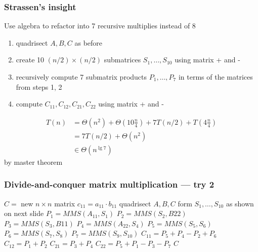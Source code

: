 \documentclass[10pt,aspectratio=169]{beamer}
\begin{document}
\begin{frame} \frametitle{Strassen's insight}
Use algebra to refactor into 7 recursive multiplies instead of 8
\begin{enumerate}
  \item quadrisect $A, B, C$ as before
  \item create 10 $(n/2) \times (n/2)$ submatrices $S_1, \ldots, S_{10}$ using
    matrix + and -
  \item recursively compute 7 submatrix products $P_1, \ldots, P_7$ in terms of
    the matrices from steps 1, 2
  \item compute $C_{11}, C_{12}, C_{21}, C_{22}$ using matrix + and -
\end{enumerate}
\begin{align*}
  T(n) &= \Theta(n^2) + \Theta(10 \frac{n}{4}) + 7 T(n/2) + T(4 \frac{n}{4}) \\
       &= 7 T(n/2) + \Theta(n^2) \\
       &\in \Theta(n^{\lg 7})
\end{align*}
by master theorem
\end{frame}
\begin{frame} \frametitle{Divide-and-conquer matrix multiplication --- try 2}
  {\tiny
  \begin{algorithmic}[1]
    \State $C = $ new $n \times n$ matrix
      \State $c_{11} = a_{11} \cdot b_{11}$
    \Else
      \State quadrisect $A, B, C$
      \State form $S_1, \ldots, S_{10}$ as shown on next slide
      \State $P_1 = MMS(A_{11}, S_1)$
      \State $P_2 = MMS(S_2, B{22})$
      \State $P_3 = MMS(S_3, B{11})$
      \State $P_4 = MMS(A_{22}, S_4)$
      \State $P_5 = MMS(S_5, S_6)$
      \State $P_6 = MMS(S_7, S_8)$
      \State $P_7 = MMS(S_9, S_{10})$
      \State $C_{11} = P_5 + P_4 - P_2 + P_6$
      \State $C_{12} = P_1 + P_2$
      \State $C_{21} = P_3 + P_4$
      \State $C_{22} = P_5 + P_1 - P_3 - P_7$
    \EndIf
    \State \Return $C$
    \EndFunction
  \end{algorithmic}
  }
\end{frame}
\end{document}
